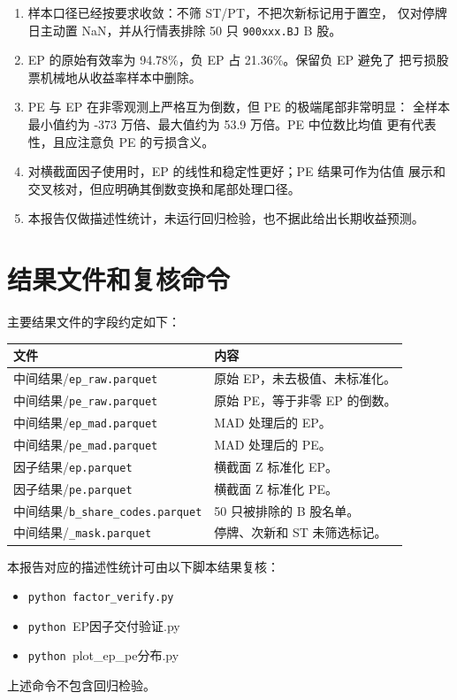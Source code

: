 \documentclass[UTF8,a4paper,11pt]{ctexart}
\newcommand{\filepath}[2]{\textnormal{#1/}\texttt{#2}}
\begin{document}
\begin{enumerate}[leftmargin=2.5em]
  \item 样本口径已经按要求收敛：不筛 ST/PT，不把次新标记用于置空，
        仅对停牌日主动置 NaN，并从行情表排除 50 只 \texttt{900xxx.BJ} B 股。
  \item EP 的原始有效率为 94.78\%，负 EP 占 21.36\%。保留负 EP 避免了
        把亏损股票机械地从收益率样本中删除。
  \item PE 与 EP 在非零观测上严格互为倒数，但 PE 的极端尾部非常明显：
        全样本最小值约为 -373 万倍、最大值约为 53.9 万倍。PE 中位数比均值
        更有代表性，且应注意负 PE 的亏损含义。
  \item 对横截面因子使用时，EP 的线性和稳定性更好；PE 结果可作为估值
        展示和交叉核对，但应明确其倒数变换和尾部处理口径。
  \item 本报告仅做描述性统计，未运行回归检验，也不据此给出长期收益预测。
\end{enumerate}

\clearpage
\appendix
\section{结果文件和复核命令}

主要结果文件的字段约定如下：

\begin{longtable}{p{}p{}}
\toprule
文件 & 内容 \\
\midrule
\endhead
\filepath{中间结果}{ep\_raw.parquet} & 原始 EP，未去极值、未标准化。\\
\filepath{中间结果}{pe\_raw.parquet} & 原始 PE，等于非零 EP 的倒数。\\
\filepath{中间结果}{ep\_mad.parquet} & MAD 处理后的 EP。\\
\filepath{中间结果}{pe\_mad.parquet} & MAD 处理后的 PE。\\
\filepath{因子结果}{ep.parquet} & 横截面 Z 标准化 EP。\\
\filepath{因子结果}{pe.parquet} & 横截面 Z 标准化 PE。\\
\filepath{中间结果}{b\_share\_codes.parquet} & 50 只被排除的 B 股名单。\\
\filepath{中间结果}{\_mask.parquet} & 停牌、次新和 ST 未筛选标记。\\
\bottomrule
\end{longtable}

本报告对应的描述性统计可由以下脚本结果复核：
\begin{itemize}[leftmargin=2.5em]
  \item \texttt{python factor\_verify.py}
  \item \texttt{python }EP因子交付验证.py
  \item \texttt{python }plot\_ep\_pe分布.py
\end{itemize}
上述命令不包含回归检验。
\end{document}
